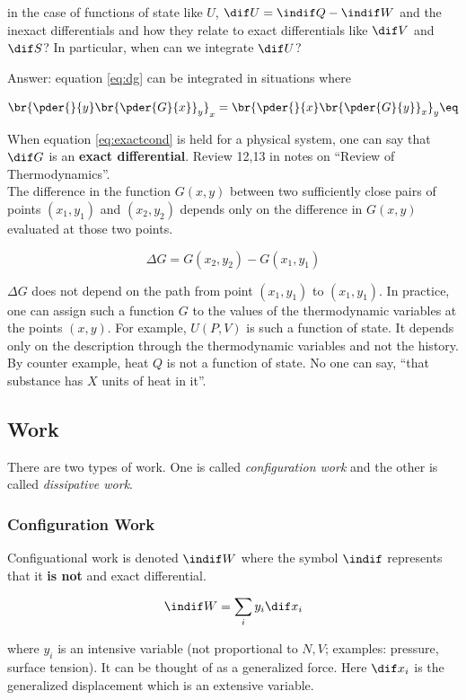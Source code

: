 \documentclass{article}
\begin{document}
in the case of functions of state like $U$, $ \dif U = \indif Q - \indif W  $ and the inexact differentials and how they relate to exact differentials like $\dif V$ and $\dif S$? In particular, when can we integrate $\dif U$?

Answer: equation \eqref{eq:dg} can be integrated in situations where

\[ \br{\pder{}{y}\br{\pder{G}{x}}_y}_x = \br{\pder{}{x}\br{\pder{G}{y}}_x}_y \eq \label{eq:exactcond}\]

When equation \eqref{eq:exactcond} is held for a physical system, one can say that $\dif G$ is an \textbf{exact differential}. Review 12,13 in notes on ``Review of Thermodynamics''. \\

The difference in the function $G(x,y)$ between two sufficiently close pairs of points $(x_1, y_1)$ and $(x_2, y_2)$ depends only on the difference in $G(x,y)$ evaluated at those two points.

\[ \Delta G = G(x_2, y_2) - G(x_1, y_1) \]

$\Delta G$ does not depend on the path from point $(x_1, y_1)$ to $(x_1, y_1)$. In practice, one can assign such a function $G$ to the values of the thermodynamic variables at the points $(x,y)$. For example, $U(P,V)$ is such a function of state. It depends only on the description through the thermodynamic variables and not the history. \\

By counter example, heat $Q$ is not a function of state. No one can say, ``that substance has $X$ units of heat in it''.

\subsection{Work}

There are two types of work. One is called \textit{configuration work} and the other is called \textit{dissipative work}. \\

\subsubsection{Configuration Work}

Configuational work is denoted $\indif W$ where the symbol $\indif$ represents that it \textbf{is not} and exact differential.

\[ \indif W = \sum_i y_i \dif x_i \]

where $y_i$ is an intensive variable (not proportional to $N, V$; examples: pressure, surface tension). It can be thought of as a generalized force. Here $\dif x_i$ is the generalized displacement which is an extensive variable.
\end{document}
